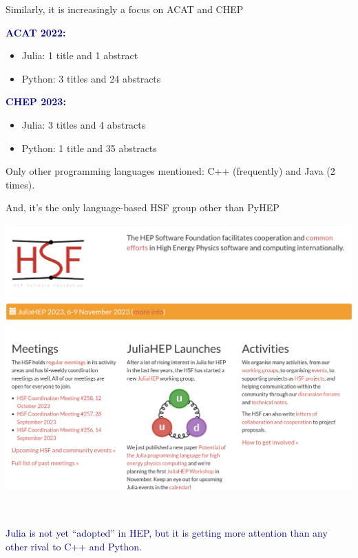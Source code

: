 \documentclass[aspectratio=169]{beamer}
\begin{document}

\begin{frame}{Similarly, it is increasingly a focus on ACAT and CHEP}
\vspace{0.5 cm}

\textcolor{darkblue}{\Large\bf ACAT 2022:}
\begin{itemize}
\item Julia: 1 title and 1 abstract
\item Python: 3 titles and 24 abstracts
\end{itemize}

\vspace{0.5 cm}
\textcolor{darkblue}{\Large\bf CHEP 2023:}
\begin{itemize}
\item Julia: 3 titles and 4 abstracts
\item Python: 1 title and 35 abstracts
\end{itemize}

\vspace{0.5 cm}
Only other programming languages mentioned: C++ (frequently) and Java (2 times).
\end{frame}

\begin{frame}{And, it's the only language-based HSF group other than PyHEP}
\vspace{0.05 cm}
\begin{center}
\includegraphics[width=0.72\linewidth]{juliahep-website.png}
\end{center}
\end{frame}

\begin{frame}{\mbox{ }}
\vspace{0.5 cm}
\LARGE
\begin{center}
\textcolor{darkblue}{Julia is not yet ``adopted'' in HEP, but it is getting more attention than any other rival to C++ and Python.}
\end{center}

\vspace{1 cm}
\begin{center}
\end{center}
\end{frame}
\end{document}
